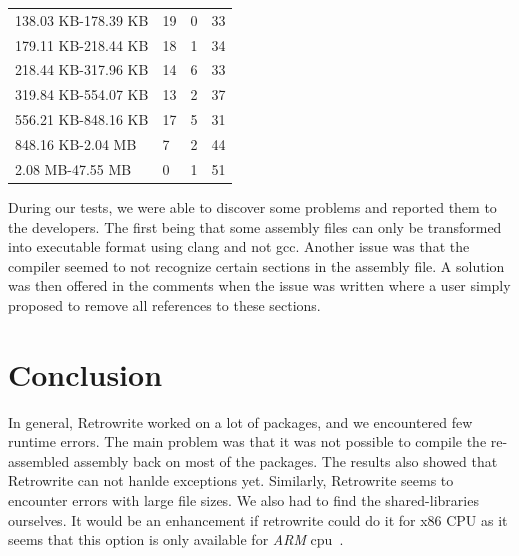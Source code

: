 \documentclass[a4paper,11pt,oneside]{report}
\newcommand{\sysname}{Retrowrite\xspace}
\begin{document}
\begin{table}[H]
\begin{tabular}{llll}
        138.03 KB-178.39 KB & 19                           & 0                                 & 33                                    \\
        179.11 KB-218.44 KB & 18                           & 1                                 & 34                                    \\
        218.44 KB-317.96 KB & 14                           & 6                                 & 33                                    \\
        319.84 KB-554.07 KB & 13                           & 2                                 & 37                                    \\
        556.21 KB-848.16 KB & 17                           & 5                                 & 31                                    \\
        848.16 KB-2.04 MB   & 7                            & 2                                 & 44                                    \\
        2.08 MB-47.55 MB    & 0                            & 1                                 & 51    \\                               
        \hline
    \end{tabular}
\end{table}

During our tests, we were able to discover some problems and reported them to
the developers. The first being that some assembly files can only be
transformed into executable format using clang and not gcc. Another issue was
that the compiler seemed to not recognize certain sections in the assembly
file. A solution was then offered in the comments when the issue was written
where a user simply proposed to remove all references to these sections.


\chapter{Conclusion}

In general, \sysname worked on a lot of packages, and we encountered few runtime
errors. The main problem was that it was not possible to compile the
re-assembled assembly back on most of the packages. The results also showed
that \sysname can not hanlde exceptions yet. Similarly, \sysname seems to
encounter errors with large file sizes. We also had to find the shared-libraries
ourselves. It would be an enhancement if retrowrite could do it for x86 CPU as
it seems that this option is only available for \textit{ARM}
cpu~\cite{retroArm}.
\end{document}
